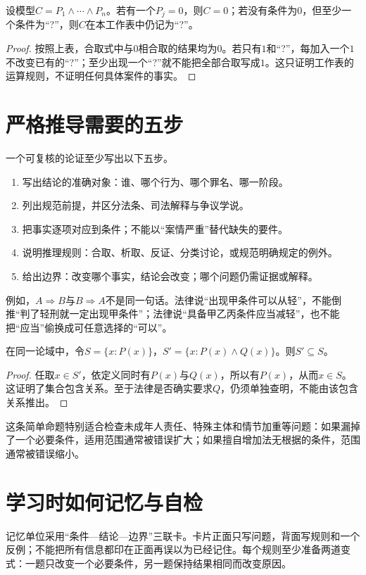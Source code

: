 \begin{modelprop}[合取条件的否定与缺口]
设模型$C=P_1\wedge\cdots\wedge P_n$。若有一个$P_j=0$，则$C=0$；若没有条件为$0$，但至少一个条件为“?”，则$C$在本工作表中仍记为“?”。
\end{modelprop}
\begin{proof}
按照上表，合取式中与$0$相合取的结果均为$0$。若只有$1$和“?”，每加入一个$1$不改变已有的“?”；至少出现一个“?”就不能把全部合取写成$1$。这只证明工作表的运算规则，不证明任何具体案件的事实。
\end{proof}

\section{严格推导需要的五步}
一个可复核的论证至少写出以下五步。
\begin{enumerate}
\item 写出结论的准确对象：谁、哪个行为、哪个罪名、哪一阶段。
\item 列出规范前提，并区分法条、司法解释与争议学说。
\item 把事实逐项对应到条件；不能以“案情严重”替代缺失的要件。
\item 说明推理规则：合取、析取、反证、分类讨论，或规范明确规定的例外。
\item 给出边界：改变哪个事实，结论会改变；哪个问题仍需证据或解释。
\end{enumerate}

例如，$A\Rightarrow B$与$B\Rightarrow A$不是同一句话。法律说“出现甲条件可以从轻”，不能倒推“判了轻刑就一定出现甲条件”；法律说“具备甲乙丙条件应当减轻”，也不能把“应当”偷换成可任意选择的“可以”。

\begin{modelprop}[增加必要条件不会扩大适用集合]
在同一论域中，令$S=\{x:P(x)\}$，$S'=\{x:P(x)\wedge Q(x)\}$。则$S'\subseteq S$。
\end{modelprop}
\begin{proof}
任取$x\in S'$，依定义同时有$P(x)$与$Q(x)$，所以有$P(x)$，从而$x\in S$。这证明了集合包含关系。至于法律是否确实要求$Q$，仍须单独查明，不能由该包含关系推出。
\end{proof}

这条简单命题特别适合检查未成年人责任、特殊主体和情节加重等问题：如果漏掉了一个必要条件，适用范围通常被错误扩大；如果擅自增加法无根据的条件，范围通常被错误缩小。

\section{学习时如何记忆与自检}
记忆单位采用“条件—结论—边界”三联卡。卡片正面只写问题，背面写规则和一个反例；不能把所有信息都印在正面再误以为已经记住。每个规则至少准备两道变式：一题只改变一个必要条件，另一题保持结果相同而改变原因。

